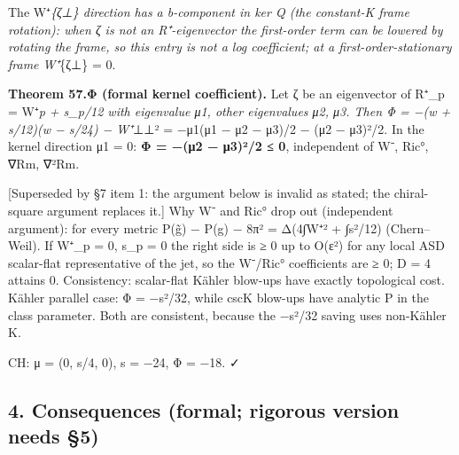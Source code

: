 \documentclass[
  10pt,
]{report}
\begin{document}
The W⁺\emph{\{ζ⊥\} direction has a b-component in ker Q (the constant-K
frame rotation): when ζ is not an R⁺-eigenvector the first-order term
can be lowered by rotating the frame, so this entry is not a log
coefficient; at a first-order-stationary frame W⁺}\{ζ⊥\} = 0.

\textbf{Theorem 57.Φ (formal kernel coefficient).} Let ζ be an
eigenvector of R⁺\_p = W⁺\emph{p + s\_p/12 with eigenvalue μ1, other
eigenvalues μ2, μ3. Then Φ = −(w + s/12)(w − s/24) −
\textbar W⁺}⊥⊥\textbar² = −μ1(μ1 − μ2 − μ3)/2 − (μ2 − μ3)²/2. In the
kernel direction μ1 = 0: \textbf{Φ = −(μ2 − μ3)²/2 ≤ 0}, independent of
W⁻, Ric°, ∇Rm, ∇²Rm.

{[}Superseded by §7 item 1: the argument below is invalid as stated; the
chiral-square argument replaces it.{]} Why W⁻ and Ric° drop out
(independent argument): for every metric P(g̃) − P(g) − 8π² =
Δ(4∫\textbar W⁺\textbar² + ∫s²/12) (Chern--Weil). If W⁺\_p = 0, s\_p = 0
the right side is ≥ 0 up to O(ε²) for any local ASD scalar-flat
representative of the jet, so the W⁻/Ric° coefficients are ≥ 0; D = 4
attains 0. Consistency: scalar-flat Kähler blow-ups have exactly
topological cost. Kähler parallel case: Φ = −s²/32, while cscK blow-ups
have analytic P in the class parameter. Both are consistent, because the
−s²/32 saving uses non-Kähler K.

CH: μ = (0, s/4, 0), s = −24, Φ = −18. ✓

\hypertarget{consequences-formal-rigorous-version-needs-5}{%
\subsection{4. Consequences (formal; rigorous version needs
§5)}\label{consequences-formal-rigorous-version-needs-5}}
\end{document}
